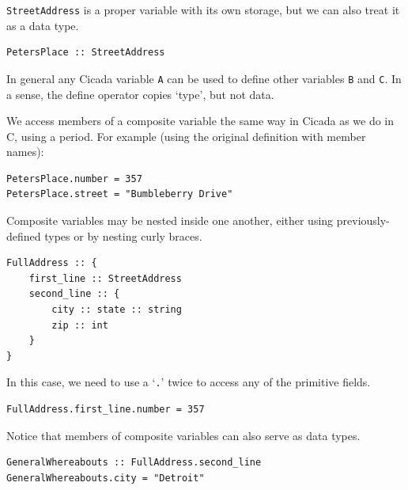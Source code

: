 \documentclass{article}
\newenvironment{code}{
       \begin{list}{}{
               \setlength{\leftmargin}{.4in}
               \setlength{\rightmargin}{0in}
               \setlength{\topsep}{.2in}
       }
       \small
       \item[] }
       { \end{list}   }
\begin{document}
\noindent \verb#StreetAddress# is a proper variable with its own storage, but we can also treat it as a data type.

\begin{code} \begin{verbatim}
PetersPlace :: StreetAddress
\end{verbatim} \end{code}

\noindent In general any Cicada variable \verb#A# can be used to define other variables \verb#B# and \verb#C#.  In a sense, the define operator copies `type', but not data.

We access members of a composite variable the same way in Cicada as we do in C, using a period.  For example (using the original definition with member names):

\begin{code} \begin{verbatim}
PetersPlace.number = 357
PetersPlace.street = "Bumbleberry Drive"
\end{verbatim} \end{code}

Composite variables may be nested inside one another, either using previously-defined types or by nesting curly braces.

\begin{code} \begin{verbatim}
FullAddress :: {
    first_line :: StreetAddress
    second_line :: {
        city :: state :: string
        zip :: int
    }
}
\end{verbatim} \end{code}

\noindent In this case, we need to use a `\texttt{.}' twice to access any of the primitive fields.

\begin{code} \begin{verbatim}
FullAddress.first_line.number = 357
\end{verbatim} \end{code}

\noindent Notice that members of composite variables can also serve as data types.

\begin{code} \begin{verbatim}
GeneralWhereabouts :: FullAddress.second_line
GeneralWhereabouts.city = "Detroit"
\end{verbatim} \end{code}
\end{document}
